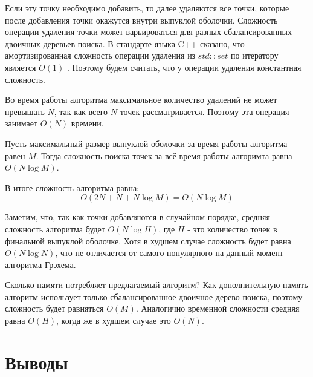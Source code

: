 Если эту точку необходимо добавить, то далее удаляются все точки, которые после добавления точки окажутся внутри выпуклой оболочки. Сложность операции удаления точки может варьироваться для разных сбалансированных двоичных деревьев поиска. В стандарте языка C++ сказано, что амортизированная сложность операции удаления из $std::set$ по итератору является $O(1)$ \cite{isoCppStd2017}. Поэтому будем считать, что у операции удаления константная сложность.

Во время работы алгоритма максимальное количество удалений не может превышать $N$, так как всего $N$ точек рассматривается. Поэтому эта операция занимает $O(N)$ времени.

Пусть максимальный размер выпуклой оболочки за время работы алгоритма равен $M$. Тогда сложность поиска точек за всё время работы алгоримта равна $O(N \log M)$.

В итоге сложность алгоритма равна:
\[
O(2 N + N + N \log M) = O(N \log M)
\]

Заметим, что, так как точки добавляются в случайном порядке, средняя сложность алгоритма будет $O(N \log H)$, где $H$ - это количество точек в финальной выпуклой оболочке. Хотя в худшем случае сложность будет равна $O(N \log N)$, что не отличается от самого популярного на данный момент алгоритма Грэхема.

Сколько памяти потребляет предлагаемый алгоритм? Как дополнительную память алгоритм использует только сбалансированное двоичное дерево поиска, поэтому сложность будет равняться $O(M)$. Аналогично временной сложности средняя равна $O(H)$, когда же в худшем случае это $O(N)$.


\section{Выводы} \label{subsect2_5}
